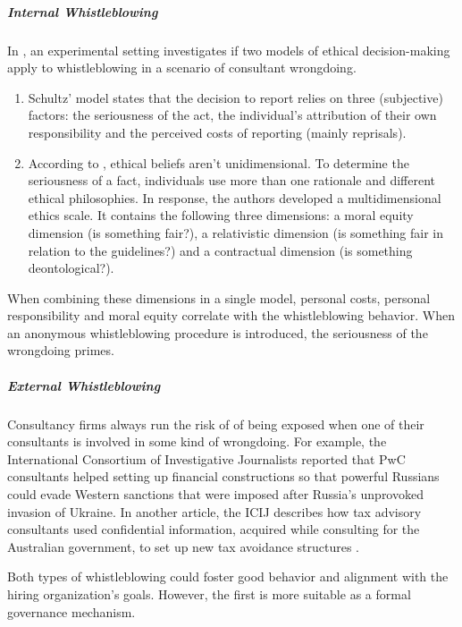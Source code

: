 \documentclass[12pt]{article}
\providecommand{\tightlist}{%
  \setlength{\itemsep}{0pt}\setlength{\parskip}{0pt}}
\begin{document}
\subparagraph{Internal Whistleblowing}\label{internal-whistleblowing}

In \citet{ayers2005}, an experimental setting investigates if two models
of ethical decision-making apply to whistleblowing in a scenario of
consultant wrongdoing.

\begin{enumerate}
\def\labelenumi{\arabic{enumi}.}
\tightlist
\item
  Schultz' \citep{schultz1993} model states that the decision to report
  relies on three (subjective) factors: the seriousness of the act, the
  individual's attribution of their own responsibility and the perceived
  costs of reporting (mainly reprisals).
\item
  According to \citep{reidenbach1990}, ethical beliefs aren't
  unidimensional. To determine the seriousness of a fact, individuals
  use more than one rationale and different ethical philosophies. In
  response, the authors developed a multidimensional ethics scale. It
  contains the following three dimensions: a moral equity dimension (is
  something fair?), a relativistic dimension (is something fair in
  relation to the guidelines?) and a contractual dimension (is something
  deontological?).
\end{enumerate}

When combining these dimensions in a single model, personal costs,
personal responsibility and moral equity correlate with the
whistleblowing behavior. When an anonymous whistleblowing procedure is
introduced, the seriousness of the wrongdoing primes.

\subparagraph{External Whistleblowing}\label{external-whistleblowing}

Consultancy firms always run the risk of of being exposed when one of
their consultants is involved in some kind of wrongdoing. For example,
the International Consortium of Investigative Journalists
\citep{icij20231} reported that PwC consultants helped setting up
financial constructions so that powerful Russians could evade Western
sanctions that were imposed after Russia's unprovoked invasion of
Ukraine. In another article, the ICIJ describes how tax advisory
consultants used confidential information, acquired while consulting for
the Australian government, to set up new tax avoidance structures
\citep{icij20232}.

Both types of whistleblowing could foster good behavior and alignment
with the hiring organization's goals. However, the first is more
suitable as a formal governance mechanism.
\end{document}
